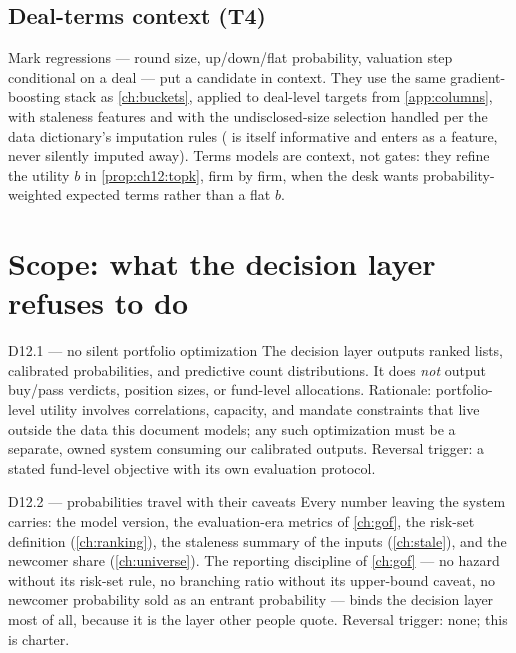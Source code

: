 \subsection{Deal-terms context (T4)}

Mark regressions --- round size, up/down/flat probability, valuation
step conditional on a deal --- put a candidate in context. They use the
same gradient-boosting stack as \cref{ch:buckets}, applied to deal-level
targets from \cref{app:columns}, with staleness features and with the
undisclosed-size selection handled per the data dictionary's imputation
rules ( is itself informative and enters as a
feature, never silently imputed away). Terms models are context, not
gates: they refine the utility $b$ in \cref{prop:ch12:topk}, firm by
firm, when the desk wants probability-weighted expected terms rather
than a flat $b$.

\section{Scope: what the decision layer refuses to do}\label{ch12:sec:scope}

\begin{decision}{D12.1 --- no silent portfolio optimization}
The decision layer outputs ranked lists, calibrated probabilities, and
predictive count distributions. It does \emph{not} output buy/pass
verdicts, position sizes, or fund-level allocations. Rationale:
portfolio-level utility involves correlations, capacity, and mandate
constraints that live outside the data this document models; any such
optimization must be a separate, owned system consuming our calibrated
outputs. Reversal trigger: a stated fund-level objective with its own
evaluation protocol.
\end{decision}

\begin{decision}{D12.2 --- probabilities travel with their caveats}
Every number leaving the system carries: the model version, the
evaluation-era metrics of \cref{ch:gof}, the risk-set definition
(\cref{ch:ranking}), the staleness summary of the inputs
(\cref{ch:stale}), and the newcomer share (\cref{ch:universe}). The
reporting discipline of \cref{ch:gof} --- no hazard without its risk-set
rule, no branching ratio without its upper-bound caveat, no newcomer
probability sold as an entrant probability --- binds the decision layer
most of all, because it is the layer other people quote. Reversal
trigger: none; this is charter.
\end{decision}

